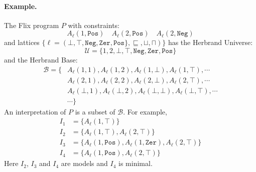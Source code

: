 \documentclass[10pt,twocolumn]{article}
\begin{document}
\paragraph{Example.}
The Flix program $P$ with constraints:
\[
    A_\ell(1, \texttt{Pos}) \quad A_\ell(2, \texttt{Pos}) \quad A_\ell(2, \texttt{Neg})
\]
and lattices $\{ \ell = (\bot, \top, \texttt{Neg}, \texttt{Zer}, \texttt{Pos}\}, \sqsubseteq, \sqcup, \sqcap) \}$ has
the Herbrand Universe:
%
\[
    \mathcal{U} = \{1, 2, \bot, \top, \texttt{Neg}, \texttt{Zer}, \texttt{Pos}\}
\]
%
and the Herbrand Base: 
%
\begin{align*}
    \mathcal{B} = \{ & A_\ell(1, 1), A_\ell(1, 2), A_\ell(1, \bot), A_\ell(1, \top), \cdots \\
                     & A_\ell(2, 1), A_\ell(2, 2), A_\ell(2, \bot), A_\ell(2, \top), \cdots \\ 
                     & A_\ell(\bot, 1), A_\ell(\bot, 2), A_\ell(\bot, \bot), A_\ell(\bot, \top), \cdots \\ 
                     & \cdots \}
\end{align*}
%
An interpretation of $P$ is a subset of $\mathcal{B}$.
For example,
%
\begin{align*}
    I_1 & = \{ A_\ell(1, \top) \} \\
    I_2 & = \{ A_\ell(1, \top), A_\ell(2, \top) \} \\
    I_3 & = \{ A_\ell(1, \texttt{Pos}), A_\ell(1, \texttt{Zer}), A_\ell(2, \top) \} \\
    I_4 & = \{ A_\ell(1, \texttt{Pos}), A_\ell(2, \top) \}
\end{align*}
%
Here $I_2$, $I_3$ and $I_4$ are models and $I_4$ is minimal.





\end{document}
